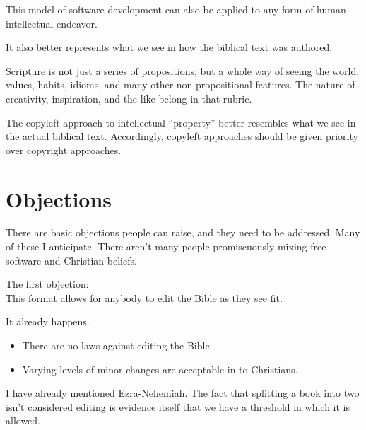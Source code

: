 \documentclass{beamer}
\begin{document}
\begin{frame}
  This model of software development can also be applied to any form of human intellectual endeavor.
\end{frame}

\begin{frame}
  It also better represents what we see in how the biblical text was authored.
\end{frame}

\begin{frame}
  Scripture is not just a series of propositions, but a whole way of seeing the world, values, habits, idioms, and many other non-propositional features.
  The nature of creativity, inspiration, and the like belong in that rubric.
\end{frame}

\begin{frame}
  The copyleft approach to intellectual ``property'' better resembles what we see in the actual biblical text.
  Accordingly, copyleft approaches should be given priority over copyright approaches.
\end{frame}

\section{Objections}

\begin{frame}
  There are basic objections people can raise, and they need to be addressed.
  Many of these I anticipate.
  There aren't many people promiscuously mixing free software and Christian beliefs.
\end{frame}

\begin{frame}
  The first objection:\\

  This format allows for anybody to edit the Bible as they see fit.
\end{frame}

\begin{frame}
  It already happens.\pause
  \begin{itemize}
	\item There are no laws against editing the Bible.\pause
	\item Varying levels of minor changes are acceptable in to Christians.
  \end{itemize}
\end{frame}

\begin{frame}
  I have already mentioned Ezra-Nehemiah.
  The fact that splitting a book into two isn't considered editing is evidence itself that we have a threshold in which it is allowed.
\end{frame}
\end{document}
